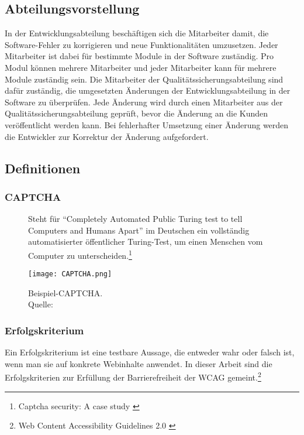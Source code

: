 \subsection{Abteilungsvorstellung}
In der Entwicklungsabteilung beschäftigen sich die Mitarbeiter damit, die Software-Fehler zu korrigieren und neue Funktionalitäten umzusetzen. Jeder Mitarbeiter ist dabei für bestimmte Module in der Software zuständig. Pro Modul können mehrere Mitarbeiter und jeder Mitarbeiter kann für mehrere Module zuständig sein. Die Mitarbeiter der Qualitätssicherungsabteilung sind dafür zuständig, die umgesetzten Änderungen der Entwicklungsabteilung in der Software zu überprüfen. Jede Änderung wird durch einen Mitarbeiter aus der Qualitätssicherungsabteilung geprüft, bevor die Änderung an die Kunden veröffentlicht werden kann. Bei fehlerhafter Umsetzung einer Änderung werden die Entwickler zur Korrektur der Änderung aufgefordert.

\subsection{Definitionen}

\subsubsection{CAPTCHA}
\begin{figure}[h]
	\begin{minipage}{0.5\textwidth}
		Steht für "`Completely Automated Public Turing test to tell Computers and Humans Apart"' im Deutschen ein vollständig automatisierter öffentlicher
		Turing-Test, um einen Menschen vom Computer zu unterscheiden.\footnote{Captcha security: A case study \cite{yan2009captcha}}
	\end{minipage}
	\hfill
	\begin{minipage}{0.4\textwidth}
		\texttt{[image: CAPTCHA.png]}
		\caption[Beispiel-CAPTCHA]{Beispiel-CAPTCHA. \\Quelle: \cite{yan2009captcha}}
	\end{minipage}
\end{figure}

\subsubsection{Erfolgskriterium}
Ein Erfolgskriterium ist eine testbare Aussage, die entweder wahr oder falsch ist, wenn man sie auf konkrete Webinhalte anwendet. In dieser
Arbeit sind die Erfolgskriterien zur Erfüllung der Barrierefreiheit der \ac{WCAG} gemeint.\footnote{Web Content Accessibility Guidelines 2.0 \cite{WCAG2.0}}

